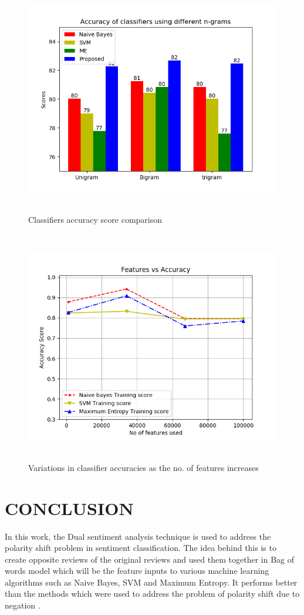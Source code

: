 \documentclass[oneside,a4paper,12pt]{pictreport}
\begin{document}
\begin{figure}[!h]
\includegraphics[width=5.0in,height=4.0in]{Comparison.png}
\caption{Classifiers accuracy score comparison}
\end{figure}


\begin{figure}[!h]
\includegraphics[width=5.0in,height=4.0in]{figure_1.png}
\caption{Variations in classifier accuracies as the no. of features increases}
\end{figure}



\chapter{CONCLUSION}
In this work, the Dual sentiment analysis technique is used
to address the polarity shift problem in sentiment classification.
The idea behind this is to create opposite reviews of the
original reviews and used them together in Bag of words model
which will be the feature inputs to various machine learning
algorithms such as Naive Bayes, SVM and Maximum Entropy. It
performs better than the methods which were used to address
the problem of polarity shift due to negation .
\end{document}

